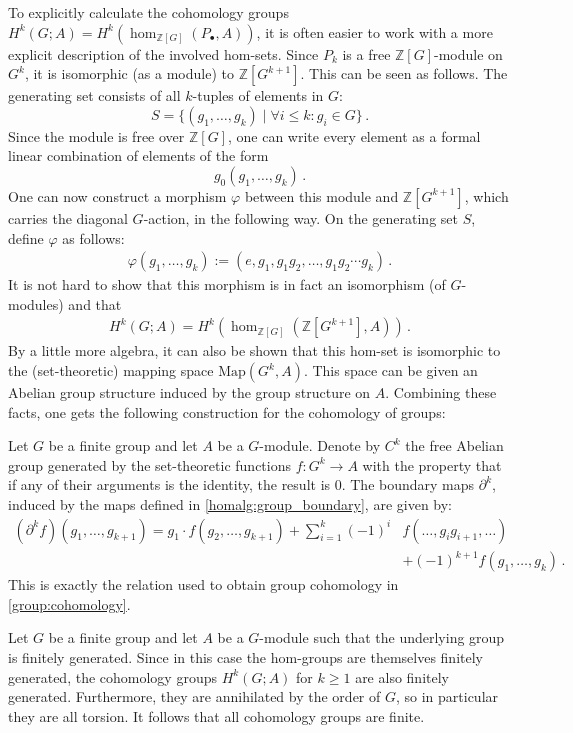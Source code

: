 	To explicitly calculate the cohomology groups $H^k(G;A) = H^k(\hom_{\mathbb{Z}[G]}(P_\bullet,A))$, it is often easier to work with a more explicit description of the involved hom-sets. Since $P_k$ is a free $\mathbb{Z}[G]$-module on $G^k$, it is isomorphic (as a module) to $\mathbb{Z}[G^{k+1}]$. This can be seen as follows. The generating set consists of all $k$-tuples of elements in $G$: \[S=\{(g_1,\ldots,g_k)\mid\forall i\leq k:g_i\in G\}\,.\] Since the module is free over $\mathbb{Z}[G]$, one can write every element as a formal linear combination of elements of the form \[g_0(g_1,\ldots,g_k)\,.\] One can now construct a morphism $\varphi$ between this module and $\mathbb{Z}[G^{k+1}]$, which carries the diagonal $G$-action, in the following way. On the generating set $S$, define $\varphi$ as follows:
	\begin{gather}
		\varphi(g_1,\ldots,g_k) := (e,g_1,g_1g_2,\ldots,g_1g_2\cdots g_k)\,.
	\end{gather}
	It is not hard to show that this morphism is in fact an isomorphism (of $G$-modules) and that
	\begin{gather}
		H^k(G;A) = H^k(\hom_{\mathbb{Z}[G]}(\mathbb{Z}[G^{k+1}],A))\,.
	\end{gather}
	By a little more algebra, it can also be shown that this hom-set is isomorphic to the (set-theoretic) mapping space $\mathrm{Map}(G^k,A)$. This space can be given an Abelian group structure induced by the group structure on $A$. Combining these facts, one gets the following construction for the cohomology of groups:
	\begin{construct}
		Let $G$ be a finite group and let $A$ be a $G$-module. Denote by $C^k$ the free Abelian group generated by the set-theoretic functions $f:G^k\rightarrow A$ with the property that if any of their arguments is the identity, the result is 0. The boundary maps $\partial^k$, induced by the maps defined in \cref{homalg:group_boundary}, are given by:
		\begin{align}
			(\partial^k f)(g_1,\ldots,g_{k+1}) = g_1\cdot f(g_2,\ldots,g_{k+1}) + \sum_{i=1}^k(-1)^i&f(\ldots,g_ig_{i+1},\ldots)\\
            &+(-1)^{k+1}f(g_1,\ldots,g_k)\,.\nonumber
		\end{align}
		This is exactly the relation used to obtain group cohomology in \cref{group:cohomology}.
	\end{construct}

	\begin{property}[Finiteness]
		Let $G$ be a finite group and let $A$ be a $G$-module such that the underlying group is finitely generated. Since in this case the hom-groups are themselves finitely generated, the cohomology groups $H^k(G;A)$ for $k\geq1$ are also finitely generated. Furthermore, they are annihilated by the order of $G$, so in particular they are all torsion. It follows that all cohomology groups are finite.
	\end{property}

